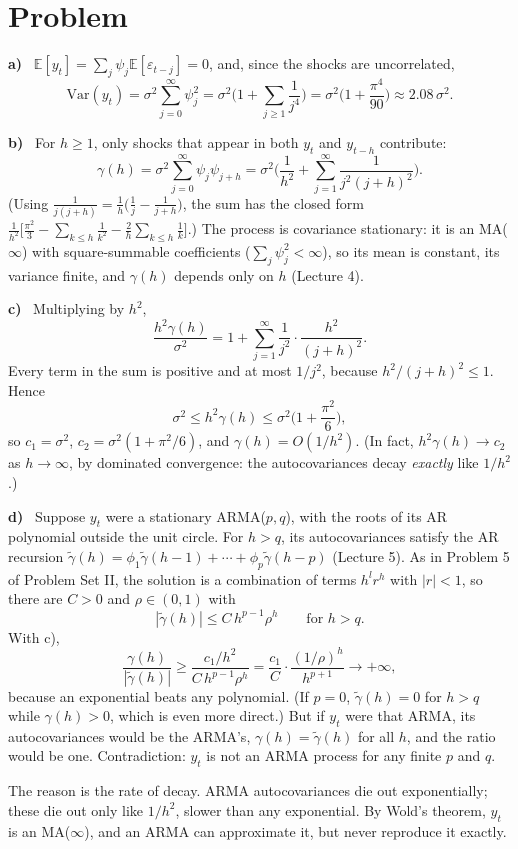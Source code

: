 \documentclass[11pt]{article}
\newcommand{\E}{\mathbb{E}}
\newcommand{\Var}{\mathrm{Var}}
\newcounter{problem}
\renewcommand{\theproblem}{\arabic{problem}}
\newcommand{\problem}{
	\stepcounter{problem}
	\section*{Problem \theproblem}
}
\newcommand{\itm}[1]{\par\textbf{#1)}\ }
\begin{document}
\problem

\itm{a}
$\E[y_t]=\sum_j\psi_j\E[\varepsilon_{t-j}]=0$, and, since the shocks are uncorrelated,
\[
\Var(y_t)=\sigma^2\sum_{j=0}^\infty\psi_j^2=\sigma^2\Big(1+\sum_{j\ge1}\frac1{j^4}\Big)=\sigma^2\Big(1+\frac{\pi^4}{90}\Big)\approx2.08\,\sigma^2 .
\]

\itm{b}
For $h\ge1$, only shocks that appear in both $y_t$ and $y_{t-h}$ contribute:
\[
\gamma(h)=\sigma^2\sum_{j=0}^\infty\psi_j\psi_{j+h}=\sigma^2\Big(\frac1{h^2}+\sum_{j=1}^\infty\frac1{j^2(j+h)^2}\Big).
\]
(Using $\frac1{j(j+h)}=\frac1h\big(\frac1j-\frac1{j+h}\big)$, the sum has the closed form $\frac1{h^2}\big[\frac{\pi^2}3-\sum_{k\le h}\frac1{k^2}-\frac2h\sum_{k\le h}\frac1k\big]$.) The process is covariance stationary: it is an MA($\infty$) with square-summable coefficients ($\sum_j\psi_j^2<\infty$), so its mean is constant, its variance finite, and $\gamma(h)$ depends only on $h$ (Lecture 4).

\itm{c}
Multiplying by $h^2$,
\[
\frac{h^2\gamma(h)}{\sigma^2}=1+\sum_{j=1}^\infty\frac1{j^2}\cdot\frac{h^2}{(j+h)^2}.
\]
Every term in the sum is positive and at most $1/j^2$, because $h^2/(j+h)^2\le1$. Hence
\[
\sigma^2\le h^2\gamma(h)\le\sigma^2\Big(1+\frac{\pi^2}6\Big),
\]
so $c_1=\sigma^2$, $c_2=\sigma^2(1+\pi^2/6)$, and $\gamma(h)=O(1/h^2)$. (In fact, $h^2\gamma(h)\to c_2$ as $h\to\infty$, by dominated convergence: the autocovariances decay \emph{exactly} like $1/h^2$.)

\itm{d}
Suppose $y_t$ were a stationary ARMA($p,q$), with the roots of its AR polynomial outside the unit circle. For $h>q$, its autocovariances satisfy the AR recursion $\tilde\gamma(h)=\phi_1\tilde\gamma(h-1)+\cdots+\phi_p\tilde\gamma(h-p)$ (Lecture 5). As in Problem 5 of Problem Set II, the solution is a combination of terms $h^lr^h$ with $|r|<1$, so there are $C>0$ and $\rho\in(0,1)$ with
\[
|\tilde\gamma(h)|\le C\,h^{p-1}\rho^h\qquad\text{for } h>q .
\]
With c),
\[
\frac{\gamma(h)}{|\tilde\gamma(h)|}\ge\frac{c_1/h^2}{C\,h^{p-1}\rho^h}=\frac{c_1}{C}\cdot\frac{(1/\rho)^h}{h^{p+1}}\longrightarrow+\infty,
\]
because an exponential beats any polynomial. (If $p=0$, $\tilde\gamma(h)=0$ for $h>q$ while $\gamma(h)>0$, which is even more direct.) But if $y_t$ were that ARMA, its autocovariances would be the ARMA's, $\gamma(h)=\tilde\gamma(h)$ for all $h$, and the ratio would be one. Contradiction: $y_t$ is not an ARMA process for any finite $p$ and $q$.

The reason is the rate of decay. ARMA autocovariances die out exponentially; these die out only like $1/h^2$, slower than any exponential. By Wold's theorem, $y_t$ is an MA($\infty$), and an ARMA can approximate it, but never reproduce it exactly.
\end{document}
